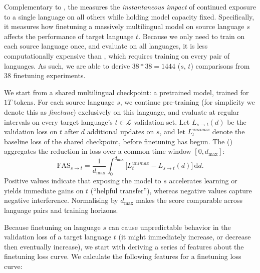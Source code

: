 Complementary to \btsabb{}, the \fas{} measures the \emph{instantaneous impact} of continued exposure to a single language on all others while holding model capacity fixed.  
Specifically, it measures how finetuning a massively multilingual model on source language $s$ affects the performance of target language $t$.
Because we only need to train on each source language once, and evaluate on all languages, it is less computationally expensive than \btsabb{}, which requires training on every pair of languages.
As such, we are able to derive $38*38=1444$ ($s$, $t$) comparisons from 38 finetuning experiments.

We start from a shared multilingual checkpoint: a \unimax{} pretrained model, trained for $1T$ tokens.
For each source language $s$, we continue pre-training (for simplicity we denote this as \emph{finetune}) exclusively on this language, and evaluate at regular intervals on every target language's $t\!\in\!\mathcal{L}$ validation set.  
Let $L_{s\!\rightarrow\!t}(d)$ be the validation loss on $t$ after $d$ additional updates on $s$, and let $L^{unimax}_t$ denote the baseline loss of the shared \unimax{} checkpoint, before finetuning has begun.  
The \fas{} (\fasabb) aggregates the reduction in loss over a common time window $[0,d_{\max}]$:
\[
\mathrm{FAS}_{s\!\rightarrow t}
=\frac{1}{d_{\max}}
\int_{0}^{d_{\max}}
\!\bigl[L^{unimax}_t - L_{s\!\rightarrow\!t}(d)\bigr]\,
\mathrm{d}d.
\]
Positive values indicate that exposing the model to $s$ accelerates learning or yields immediate gains on $t$ (``helpful transfer''), whereas negative values capture negative interference. Normalising by $d_{\max}$ makes the score comparable across language pairs and training horizons.

Because finetuning on language $s$ can cause unpredictable behavior in the validation loss of a target language $t$ (it might immediately increase, or decrease then eventually increase), we start with deriving a series of features about the finetuning loss curve. 
We calculate the following features for a finetuning loss curve:

